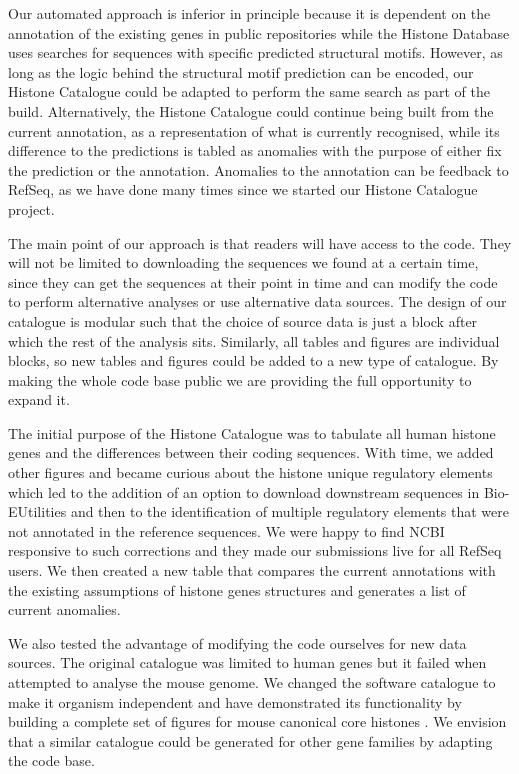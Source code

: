 Our automated
approach is inferior in principle because it is dependent on the
annotation of the existing genes in public repositories
while the Histone Database uses searches for
sequences with specific predicted structural motifs.  However, as long
as the logic behind the structural motif prediction can be encoded,
our Histone Catalogue could be adapted to perform the same search as
part of the build.
Alternatively, the Histone Catalogue could continue being built from
the current annotation, as a representation of what is currently
recognised, while its difference to the predictions is tabled as
anomalies with the purpose of either fix the prediction or the
annotation.
Anomalies to the annotation can be feedback to RefSeq, as we have done
many times since we started our Histone Catalogue project.

The main point of our approach is that readers will have access to the
code.  They will not be limited to downloading the sequences we found
at a certain time, since
they can get the sequences at their point in time and can modify the
code to perform alternative analyses or use alternative data sources.
The design of our catalogue is
modular such that the choice of source data is just a block after
which the rest of the
analysis sits.  Similarly, all tables and figures are individual
blocks, so new tables and figures could be added to a new type of catalogue.
By making the whole code base public we are providing the full opportunity
to expand it.

The initial purpose of the Histone Catalogue
was to tabulate all human histone genes and the differences between
their coding sequences.  With time, we added other figures and became
curious about the histone unique regulatory elements which
led to the addition of an option to download downstream sequences in
Bio-EUtilities and then to the identification of multiple regulatory
elements that were not annotated in the reference sequences.  We were
happy to find NCBI responsive to such corrections and they made
our submissions live for all RefSeq users.
We then created a new table  that compares
the current annotations with the existing assumptions of histone genes
structures and generates a list of current anomalies.

We also tested the advantage of modifying the code ourselves for new
data sources.  The original catalogue was limited to human genes but it
failed when attempted to analyse the mouse genome.  We changed
the software catalogue to make it organism independent and have
demonstrated its functionality by building a complete set of figures
for mouse canonical core histones
.  We envision that a similar catalogue
could be generated for other gene families by adapting the code base.

